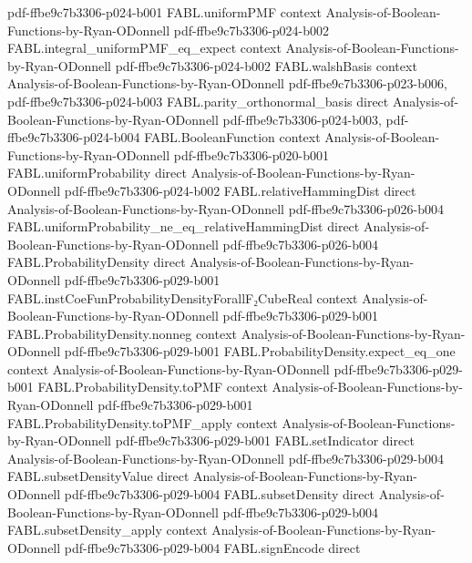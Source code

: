 \begin{theorem}
  {pdf-ffbe9c7b3306-p024-b001}
\proofstep
  {FABL.uniformPMF}
  {context}
  {Analysis-of-Boolean-Functions-by-Ryan-ODonnell}
  {pdf-ffbe9c7b3306-p024-b002}
\proofstep
  {FABL.integral_uniformPMF_eq_expect}
  {context}
  {Analysis-of-Boolean-Functions-by-Ryan-ODonnell}
  {pdf-ffbe9c7b3306-p024-b002}
\proofstep
  {FABL.walshBasis}
  {context}
  {Analysis-of-Boolean-Functions-by-Ryan-ODonnell}
  {pdf-ffbe9c7b3306-p023-b006,
    pdf-ffbe9c7b3306-p024-b003}
\proofstep
  {FABL.parity_orthonormal_basis}
  {direct}
  {Analysis-of-Boolean-Functions-by-Ryan-ODonnell}
  {pdf-ffbe9c7b3306-p024-b003,
    pdf-ffbe9c7b3306-p024-b004}
\proofstep
  {FABL.BooleanFunction}
  {context}
  {Analysis-of-Boolean-Functions-by-Ryan-ODonnell}
  {pdf-ffbe9c7b3306-p020-b001}
\proofstep
  {FABL.uniformProbability}
  {direct}
  {Analysis-of-Boolean-Functions-by-Ryan-ODonnell}
  {pdf-ffbe9c7b3306-p024-b002}
\proofstep
  {FABL.relativeHammingDist}
  {direct}
  {Analysis-of-Boolean-Functions-by-Ryan-ODonnell}
  {pdf-ffbe9c7b3306-p026-b004}
\proofstep
  {FABL.uniformProbability_ne_eq_relativeHammingDist}
  {direct}
  {Analysis-of-Boolean-Functions-by-Ryan-ODonnell}
  {pdf-ffbe9c7b3306-p026-b004}
\proofstep
  {FABL.ProbabilityDensity}
  {direct}
  {Analysis-of-Boolean-Functions-by-Ryan-ODonnell}
  {pdf-ffbe9c7b3306-p029-b001}
\proofstep
  {FABL.instCoeFunProbabilityDensityForallF₂CubeReal}
  {context}
  {Analysis-of-Boolean-Functions-by-Ryan-ODonnell}
  {pdf-ffbe9c7b3306-p029-b001}
\proofstep
  {FABL.ProbabilityDensity.nonneg}
  {context}
  {Analysis-of-Boolean-Functions-by-Ryan-ODonnell}
  {pdf-ffbe9c7b3306-p029-b001}
\proofstep
  {FABL.ProbabilityDensity.expect_eq_one}
  {context}
  {Analysis-of-Boolean-Functions-by-Ryan-ODonnell}
  {pdf-ffbe9c7b3306-p029-b001}
\proofstep
  {FABL.ProbabilityDensity.toPMF}
  {context}
  {Analysis-of-Boolean-Functions-by-Ryan-ODonnell}
  {pdf-ffbe9c7b3306-p029-b001}
\proofstep
  {FABL.ProbabilityDensity.toPMF_apply}
  {context}
  {Analysis-of-Boolean-Functions-by-Ryan-ODonnell}
  {pdf-ffbe9c7b3306-p029-b001}
\proofstep
  {FABL.setIndicator}
  {direct}
  {Analysis-of-Boolean-Functions-by-Ryan-ODonnell}
  {pdf-ffbe9c7b3306-p029-b004}
\proofstep
  {FABL.subsetDensityValue}
  {direct}
  {Analysis-of-Boolean-Functions-by-Ryan-ODonnell}
  {pdf-ffbe9c7b3306-p029-b004}
\proofstep
  {FABL.subsetDensity}
  {direct}
  {Analysis-of-Boolean-Functions-by-Ryan-ODonnell}
  {pdf-ffbe9c7b3306-p029-b004}
\proofstep
  {FABL.subsetDensity_apply}
  {context}
  {Analysis-of-Boolean-Functions-by-Ryan-ODonnell}
  {pdf-ffbe9c7b3306-p029-b004}
\proofstep
  {FABL.signEncode}
  {direct}

\end{theorem}
